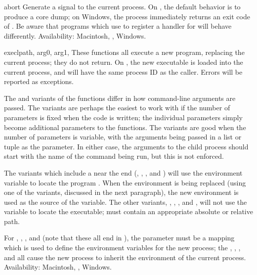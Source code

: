 \begin{funcdesc}{abort}{}
Generate a  signal to the current process.  On
\UNIX, the default behavior is to produce a core dump; on Windows, the
process immediately returns an exit code of .  Be aware that
programs which use  to register a handler
for  will behave differently.
Availability: Macintosh, \UNIX, Windows.
\end{funcdesc}

\begin{funcdesc}{execl}{path, arg0, arg1, \moreargs}
These functions all execute a new program, replacing the current
process; they do not return.  On \UNIX, the new executable is loaded
into the current process, and will have the same process ID as the
caller.  Errors will be reported as  exceptions.

The  and  variants of the
 functions differ in how command-line arguments are
passed.  The  variants are perhaps the easiest to work
with if the number of parameters is fixed when the code is written;
the individual parameters simply become additional parameters to the
 functions.  The  variants are good
when the number of parameters is variable, with the arguments being
passed in a list or tuple as the  parameter.  In either
case, the arguments to the child process should start with the name of
the command being run, but this is not enforced.

The variants which include a  near the end
(, , ,
and ) will use the  environment
variable to locate the program .  When the environment is
being replaced (using one of the  variants,
discussed in the next paragraph), the
new environment is used as the source of the  variable.
The other variants, , ,
, and , will not use the
 variable to locate the executable;  must
contain an appropriate absolute or relative path.

For , , ,
and  (note that these all end in ),
the  parameter must be a mapping which is used to define the
environment variables for the new process; the ,
, , and 
all cause the new process to inherit the environment of the current
process.
Availability: Macintosh, \UNIX, Windows.
\end{funcdesc}

